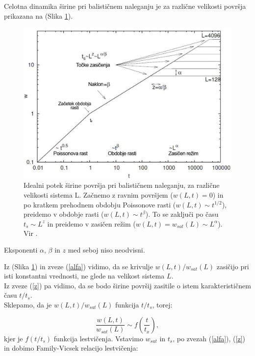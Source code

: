 \documentclass[a4paper, twoside, 12pt]{book}
\begin{document}
Celotna dinamika širine pri balističnem naleganju je za različne velikosti površja prikazana na (Slika \ref{fig:barabasi}).

    \begin{figure}[h]
      \begin{center}
        \includegraphics[width=12cm]{slike/bdep3}
      \end{center}
      \caption{Idealni potek širine površja pri balističnem naleganju, za različne velikosti sistema L. Začnemo z ravnim površjem ($w(L,t)=0$) in po kratkem prehodnem obdobju Poissonove rasti ($w(L,t) \sim t^{1/2}$), preidemo v obdobje rasti ($w(L,t) \sim t^{\beta}$). To se zaključi po času $t_s \sim L^z$ in preidemo v zasičen režim ($w(L,t) = w_{sat}(L) \sim L^{\alpha}$). Vir \cite{schwettmann2003}.}
      \label{fig:barabasi}
    \end{figure}

Eksponenti $\alpha$, $\beta$ in $z$ med seboj niso neodvisni.

Iz (Slika \ref{fig:barabasi}) in zveze (\ref{alfa}) vidimo, da se krivulje $w(L,t)/w_{sat}(L)$ zasičijo pri isti konstantni vrednosti, ne glede na velikost sistema $L$.\\
Iz zveze (\ref{z}) pa vidimo, da se bodo širine površij zasitile o istem karakterističnem času $t/t_s$. \\
Sklepamo, da je $w(L,t)/w_{sat}(L)$ funkcija $t/t_s$, torej:

  \begin{equation}
    \frac{w(L,t)}{w_{sat}(L)} \sim f(\frac{t}{t_x}),
  \end{equation}
kjer je $f(t/t_s)$ funkcija lestvičenja. Vstavimo $w_{sat}$ in $t_s$, po zvezah (\ref{alfa}), (\ref{z}) in dobimo Family-Vicsek relacijo lestvičenja:
\end{document}
